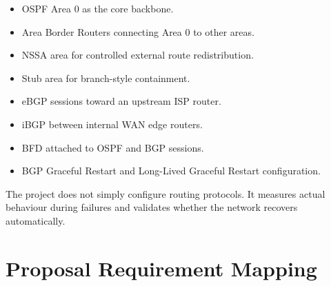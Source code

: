 \documentclass[12pt,a4paper]{article}
\begin{document}
\begin{itemize}
\item OSPF Area 0 as the core backbone.
\item Area Border Routers connecting Area 0 to other areas.
\item NSSA area for controlled external route redistribution.
\item Stub area for branch-style containment.
\item eBGP sessions toward an upstream ISP router.
\item iBGP between internal WAN edge routers.
\item BFD attached to OSPF and BGP sessions.
\item BGP Graceful Restart and Long-Lived Graceful Restart configuration.
\end{itemize}

The project does not simply configure routing protocols. It measures actual behaviour during failures and validates whether the network recovers automatically.

\section{Proposal Requirement Mapping}
\end{document}
